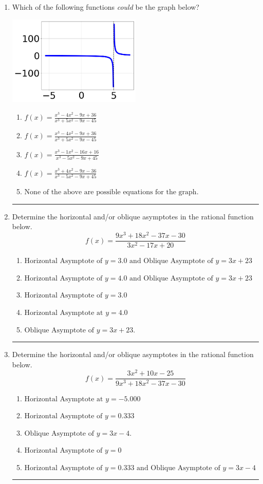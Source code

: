 \documentclass[14pt]{extbook}
\newcommand{\litem}[1]{\item#1\hspace*{-1cm}\rule{\textwidth}{0.4pt}}
\begin{document}
\begin{enumerate}
{\begin{enumerate}[label=\Alph*.]
\end{enumerate} }
\litem{
Which of the following functions \textit{could} be the graph below?
\begin{center}
    \includegraphics[width=0.5\textwidth]{../Figures/identifyGraphOfRationalFunctionC.png}
\end{center}
\begin{enumerate}[label=\Alph*.]
\item \( f(x)=\frac{x^{3} -4 x^{2} -9 x + 36}{x^{3} +5 x^{2} -9 x -45} \)
\item \( f(x)=\frac{x^{3} -4 x^{2} -9 x + 36}{x^{3} +5 x^{2} -9 x -45} \)
\item \( f(x)=\frac{x^{3} -1 x^{2} -16 x + 16}{x^{3} -5 x^{2} -9 x + 45} \)
\item \( f(x)=\frac{x^{3} +4 x^{2} -9 x -36}{x^{3} -5 x^{2} -9 x + 45} \)
\item \( \text{None of the above are possible equations for the graph.} \)

\end{enumerate} }
\litem{
Determine the horizontal and/or oblique asymptotes in the rational function below.\[ f(x) = \frac{9x^{3} +18 x^{2} -37 x -30}{3x^{2} -17 x + 20} \]\begin{enumerate}[label=\Alph*.]
\item \( \text{Horizontal Asymptote of } y = 3.0 \text{ and Oblique Asymptote of } y = 3x + 23 \)
\item \( \text{Horizontal Asymptote of } y = 4.0 \text{ and Oblique Asymptote of } y = 3x + 23 \)
\item \( \text{Horizontal Asymptote of } y = 3.0  \)
\item \( \text{Horizontal Asymptote at } y = 4.0 \)
\item \( \text{Oblique Asymptote of } y = 3x + 23. \)

\end{enumerate} }
\litem{
Determine the horizontal and/or oblique asymptotes in the rational function below.\[ f(x) = \frac{3x^{2} +10 x -25}{9x^{3} +18 x^{2} -37 x -30} \]\begin{enumerate}[label=\Alph*.]
\item \( \text{Horizontal Asymptote at } y = -5.000 \)
\item \( \text{Horizontal Asymptote of } y = 0.333  \)
\item \( \text{Oblique Asymptote of } y = 3x -4. \)
\item \( \text{Horizontal Asymptote of } y = 0 \)
\item \( \text{Horizontal Asymptote of } y = 0.333 \text{ and Oblique Asymptote of } y = 3x -4 \)


\end{enumerate}}
\end{enumerate}
\end{document}

